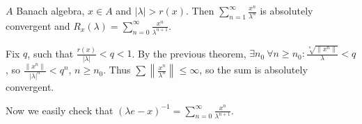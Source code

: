 \documentclass[12pt]{article}					%
\begin{document}
\begin{dusledek}
	$A$ Banach algebra, $x \in A$ and $|\lambda| > r(x)$. Then $\sum_{n=1}^∞ \frac{x^n}{\lambda^n}$ is absolutely convergent and $R_x(\lambda) = \sum_{n=0}^∞ \frac{x^n}{\lambda^{n + 1}}$.

	\begin{dukazin}
		Fix $q$, such that $\frac{r(x)}{|\lambda|} < q < 1$. By the previous theorem, $\exists n_0\ \forall n ≥ n_0: \frac{\sqrt[n]{\|x^n\|}}{\lambda} < q$, so $\frac{\|x^n\|}{|\lambda|^n} < q^n$, $n ≥ n_0$. Thus $\sum \left\| \frac{x^n}{\lambda^n}\right\| ≤ ∞$, so the sum is absolutely convergent.

		Now we easily check that $(\lambda e - x)^{-1} = \sum_{n=0}^∞ \frac{x^n}{\lambda^{n + 1}}$.
	\end{dukazin}
\end{dusledek}
\end{document}
